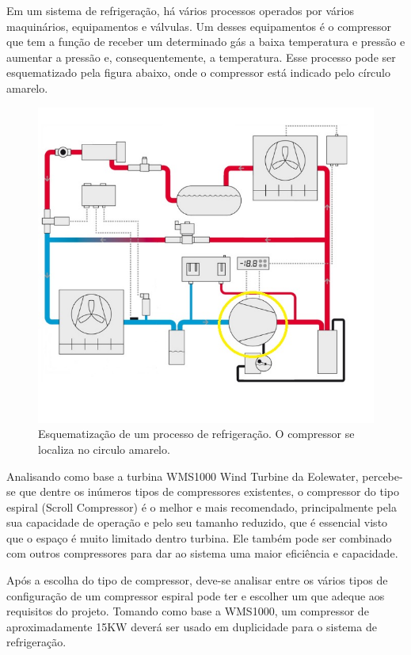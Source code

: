 Em um sistema de refrigeração, há vários processos operados por vários maquinários, equipamentos e válvulas. Um desses equipamentos é o compressor que tem a função de receber um determinado gás a baixa temperatura e pressão e aumentar a pressão e, consequentemente, a temperatura. Esse processo pode ser esquematizado pela figura abaixo, onde o compressor está indicado pelo círculo amarelo.
\begin{figure}[!htbp]
  \centering
  \includegraphics[scale=0.6]{editaveis/figuras/compressor}
  \caption[Esquematização processo refrigeração]
  {Esquematização de um processo de refrigeração. O compressor se localiza no circulo amarelo.\footnotemark}
  \label{compressor}
\end{figure}
\FloatBarrier
Analisando como base a turbina WMS1000 Wind Turbine da Eolewater, percebe-se que dentre os inúmeros tipos de compressores existentes, o compressor do tipo espiral (Scroll Compressor) é o melhor e mais recomendado, principalmente pela sua capacidade de operação  e pelo seu tamanho reduzido, que é essencial visto que o espaço é muito limitado dentro turbina. Ele também pode ser combinado com outros compressores para dar ao sistema uma maior eficiência e capacidade\cite{compressors}.

Após a escolha do tipo de compressor, deve-se analisar entre os vários tipos de configuração de um compressor espiral pode ter e escolher um que adeque aos requisitos do projeto. Tomando como base a WMS1000, um compressor de aproximadamente 15KW  deverá ser usado em duplicidade para o sistema de refrigeração. 

